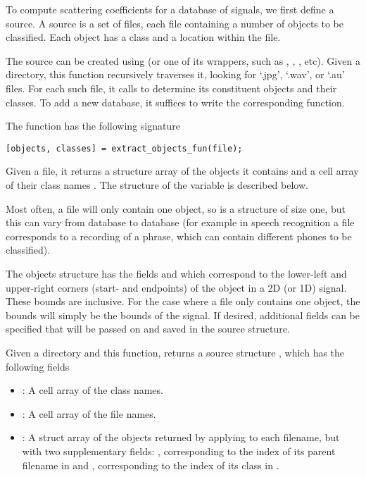 \documentclass[twocolumn]{article}
\begin{document}
To compute scattering coefficients for a database of signals, we first define a source. A source is a set of files, each file containing a number of objects to be classified. Each object has a class and a location within the file.

The source can be created using  (or one of its wrappers, such as , , , etc). Given a directory, this function recursively traverses it, looking for `.jpg', `.wav', or `.au' files. For each such file, it calls  to determine its constituent objects and their classes. To add a new database, it suffices to write the corresponding  function.

The  function has the following signature
\begin{lstlisting}
[objects, classes] = extract_objects_fun(file);
\end{lstlisting}
Given a file, it returns a structure array  of the objects it contains and a cell array of their class names . The structure of the  variable is described below.

Most often, a file will only contain one object, so  is a  structure of size one, but this can vary from database to database (for example in speech recognition a file corresponds to a recording of a phrase, which can contain different phones to be classified).

The objects structure has the fields  and  which correspond to the lower-left and upper-right corners (start- and endpoints) of the object in a 2D (or 1D) signal. These bounds are inclusive. For the case where a file only contains one object, the bounds will simply be the bounds of the signal. If desired, additional fields can be specified that will be passed on and saved in the source structure.

Given a directory and this function,  returns a source structure , which has the following fields
\begin{itemize}
	\item {}: A cell array of the class names.
	\item {}: A cell array of the file names.
	\item {}: A struct array of the objects returned by applying  to each filename, but with two supplementary fields: , corresponding to the index of its parent filename in  and , corresponding to the index of its class in .
\end{itemize}
\end{document}
